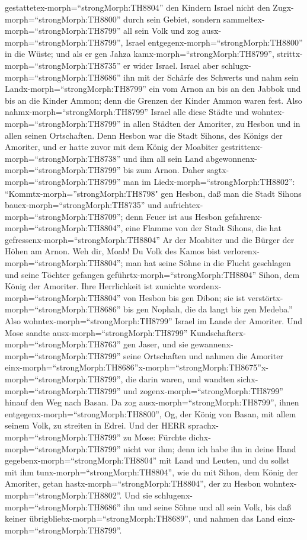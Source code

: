 gestattetex-morph=``strongMorph:TH8804'' den Kindern Israel nicht den
Zugx-morph=``strongMorph:TH8800'' durch sein Gebiet, sondern
sammeltex-morph=``strongMorph:TH8799'' all sein Volk und zog
ausx-morph=``strongMorph:TH8799'', Israel
entgegenx-morph=``strongMorph:TH8800'' in die Wüste; und als er gen
Jahza kamx-morph=``strongMorph:TH8799'',
strittx-morph=``strongMorph:TH8735'' er wider Israel. 
Israel aber schlugx-morph=``strongMorph:TH8686'' ihn mit der Schärfe des
Schwerts und nahm sein Landx-morph=``strongMorph:TH8799'' ein vom Arnon
an bis an den Jabbok und bis an die Kinder Ammon; denn die Grenzen der
Kinder Ammon waren fest.  Also
nahmx-morph=``strongMorph:TH8799'' Israel alle diese Städte und
wohntex-morph=``strongMorph:TH8799'' in allen Städten der Amoriter, zu
Hesbon und in allen seinen Ortschaften.  Denn Hesbon war
die Stadt Sihons, des Königs der Amoriter, und er hatte zuvor mit dem
König der Moabiter gestrittenx-morph=``strongMorph:TH8738'' und ihm all
sein Land abgewonnenx-morph=``strongMorph:TH8799'' bis zum Arnon.
 Daher sagtx-morph=``strongMorph:TH8799'' man im
Liedx-morph=``strongMorph:TH8802'': ``Kommtx-morph=''strongMorph:TH8798"
gen Hesbon, daß man die Stadt Sihons bauex-morph=``strongMorph:TH8735''
und aufrichtex-morph=``strongMorph:TH8709'';  denn Feuer
ist aus Hesbon gefahrenx-morph=``strongMorph:TH8804'', eine Flamme von
der Stadt Sihons, die hat gefressenx-morph=``strongMorph:TH8804'' Ar der
Moabiter und die Bürger der Höhen am Arnon.  Weh dir, Moab!
Du Volk des Kamos bist verlorenx-morph=``strongMorph:TH8804''; man hat
seine Söhne in die Flucht geschlagen und seine Töchter gefangen
geführtx-morph=``strongMorph:TH8804'' Sihon, dem König der Amoriter.
 Ihre Herrlichkeit ist zunichte
wordenx-morph=``strongMorph:TH8804'' von Hesbon bis gen Dibon; sie ist
verstörtx-morph=``strongMorph:TH8686'' bis gen Nophah, die da langt bis
gen Medeba.''  Also wohntex-morph=``strongMorph:TH8799''
Israel im Lande der Amoriter.  Und Mose sandte
ausx-morph=``strongMorph:TH8799''
Kundschafterx-morph=``strongMorph:TH8763'' gen Jaser, und sie
gewannenx-morph=``strongMorph:TH8799'' seine Ortschaften und nahmen die
Amoriter
einx-morph=``strongMorph:TH8686''\textbar x-morph=``strongMorph:TH8675''x-morph=``strongMorph:TH8799'',
die darin waren,  und wandten
sichx-morph=``strongMorph:TH8799'' und
zogenx-morph=``strongMorph:TH8799'' hinauf den Weg nach Basan. Da zog
ausx-morph=``strongMorph:TH8799'', ihnen
entgegenx-morph=``strongMorph:TH8800'', Og, der König von Basan, mit
allem seinem Volk, zu streiten in Edrei.  Und der HERR
sprachx-morph=``strongMorph:TH8799'' zu Mose: Fürchte
dichx-morph=``strongMorph:TH8799'' nicht vor ihm; denn ich habe ihn in
deine Hand gegebenx-morph=``strongMorph:TH8804'' mit Land und Leuten,
und du sollst mit ihm tunx-morph=``strongMorph:TH8804'', wie du mit
Sihon, dem König der Amoriter, getan hastx-morph=``strongMorph:TH8804'',
der zu Hesbon wohntex-morph=``strongMorph:TH8802''.  Und
sie schlugenx-morph=``strongMorph:TH8686'' ihn und seine Söhne und all
sein Volk, bis daß keiner übrigbliebx-morph=``strongMorph:TH8689'', und
nahmen das Land einx-morph=``strongMorph:TH8799''.


